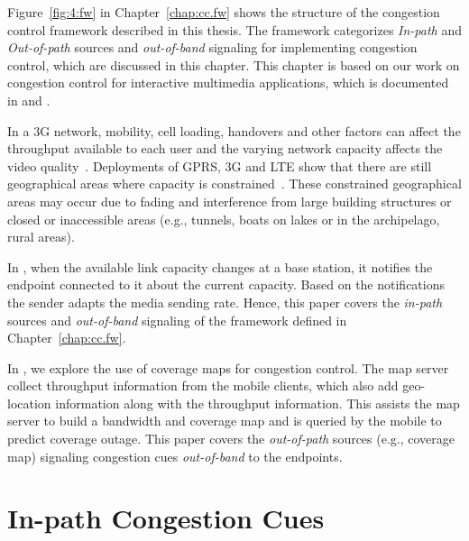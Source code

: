 Figure~\ref{fig:4:fw} in Chapter~\ref{chap:cc.fw} shows the structure of the
congestion control framework described in this thesis. The framework
categorizes \emph{In-path} and \emph{Out-of-path} sources and
\emph{out-of-band} signaling for implementing congestion control, which are
discussed in this chapter. This chapter is based on our work on congestion
control for interactive multimedia applications, which is documented in
 and .

In a 3G network, mobility, cell loading, handovers and other factors can
affect the throughput available to each user and the varying network capacity
affects the video quality~\cite{diaz2007evaluating}. Deployments of GPRS, 3G
and LTE show that there are still geographical areas where capacity is
constrained~\cite{Curcio:glass, 6576402}. These constrained geographical areas
may occur due to fading and interference from large building structures or
closed or inaccessible areas (e.g., tunnels, boats on lakes or in the
archipelago, rural areas).

In , when the available link capacity changes at a base
station, it notifies the endpoint connected to it about the current capacity.
Based on the notifications the sender adapts the media sending rate. Hence,
this paper covers the \emph{in-path} sources and \emph{out-of-band} signaling
of the framework defined in Chapter~\ref{chap:cc.fw}.

In , we explore the use of coverage maps for congestion
control. The map server collect throughput information from the mobile
clients, which also add geo-location information along with the throughput
information. This assists the map server to build a bandwidth and coverage map
and is queried by the mobile to predict coverage outage. This paper covers the
\emph{out-of-path} sources (e.g., coverage map) signaling congestion cues
\emph{out-of-band} to the endpoints.

\section{In-path Congestion Cues}

